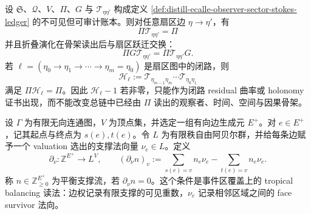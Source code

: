 \begin{theorem}\label{thm:distill-ecalle-observer-sector-stokes-skeleton-holonomy}
设 \(\mathfrak S\)、\(\mathcal Q\)、\(V\)、\(\Pi\)、\(G\) 与 \(\mathcal T_{\eta\eta'}\) 构成定义
\ref{def:distill-ecalle-observer-sector-stokes-ledger} 的不可见但可审计账本。则对任意扇区边
\(\eta\to\eta'\)，有
\[
\Pi\mathcal T_{\eta\eta'}=\Pi
\]
并且折叠演化在骨架读出后与扇区跃迁交换：
\[
\Pi G\mathcal T_{\eta\eta'}=\Pi\mathcal T_{\eta\eta'}G.
\]
若
\(\ell=(\eta_0\to\eta_1\to\cdots\to\eta_m=\eta_0)\) 是扇区图中的闭路，则
\[
\mathcal H_\ell:=
\mathcal T_{\eta_{m-1}\eta_m}\cdots\mathcal T_{\eta_0\eta_1}
\]
满足 \(\Pi\mathcal H_\ell=\Pi\)。因此
\(\mathcal H_\ell-1\) 若非零，只能作为闭路 residual 曲率或 holonomy 证书出现，而不能改变总链中已经由 \(\Pi\) 读出的观察者、时间、空间与因果骨架。
\end{theorem}
\begin{definition}[事件覆盖的支撑平衡账本]\label{def:distill-khovanskii-event-support-balance-ledger}
设 \(\Gamma\) 为有限无向连通图，\(V\) 为顶点集，并选定一组有向边生成元 \(E^+\)。对 \(e\in E^+\)，记其起点与终点为 \(s(e),t(e)\)。令 \(L\) 为有限秩自由阿贝尔群，并给每条边赋予一个 valuation 选出的支撑法向量 \(\nu_e\in L\)。定义
\[
\partial_\nu:\mathbb Z^{E^+}\longrightarrow L^V,
\qquad
(\partial_\nu n)_v
:=\sum_{s(e)=v}n_e\nu_e-\sum_{t(e)=v}n_e\nu_e .
\]
称 \(n\in\mathbb Z_{\ge0}^{E^+}\) 为平衡支撑流，若 \(\partial_\nu n=0\)。这个条件是事件区覆盖上的 tropical balancing 读法：边权记录有限支撑的可见重数，\(\nu_e\) 记录相邻区域之间的 face survivor 法向。
\end{definition}

